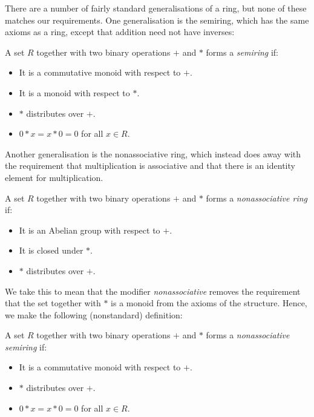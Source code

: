 There are a number of fairly standard generalisations of a ring, but none of these matches our requirements. One generalisation is the semiring, which has the same axioms as a ring, except that addition need not have inverses:
\begin{Definition}
A set $R$ together with two binary operations $+$ and $*$ forms a \emph{semiring} if:
\begin{itemize}
\item It is a commutative monoid with respect to $+$.
\item It is a monoid with respect to $*$.
\item $*$ distributes over $+$.
\item $0 * x = x * 0 = 0$ for all $x \in R$.
\end{itemize}
\end{Definition}
Another generalisation is the nonassociative ring, which instead does away with the requirement that multiplication is associative and that there is an identity element for multiplication.
\begin{Definition}
A set $R$ together with two binary operations $+$ and $*$ forms a \emph{non\-associative ring} if:
\begin{itemize}
\item It is an Abelian group with respect to $+$.
\item It is closed under $*$.
\item $*$ distributes over $+$.
\end{itemize}
\end{Definition}
We take this to mean that the modifier \emph{nonassociative} removes the requirement that the set together with $*$ is a monoid from the axioms of the structure. Hence, we make the following (nonstandard) definition:
\begin{Definition}\label{Def:NonassocSemiring}
A set $R$ together with two binary operations $+$ and $*$ forms a \emph{non\-associative semiring} if:
\begin{itemize}
\item It is a commutative monoid with respect to $+$.
\item $*$ distributes over $+$.
\item $0 * x = x * 0 = 0$ for all $x \in R$.
\end{itemize}
\end{Definition}


